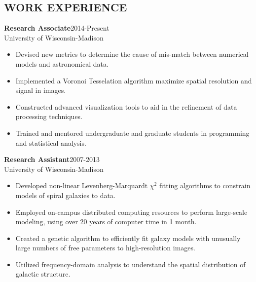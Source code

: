 \documentclass[11pt, margin]{res_hacked_long}
\begin{document}
\begin{resume}
\section{WORK EXPERIENCE}
{\bf Research Associate}\hfill\mbox{2014-Present}\\
University of Wisconsin-Madison
                  \vspace* {0.01 in}\begin{itemize} \itemsep -2pt
                    \item Devised new metrics to determine the cause
                      of mis-match between numerical models and
                      astronomical data.
                    \item Implemented a Voronoi Tesselation algorithm
                      maximize spatial resolution and signal in images.
                    \item Constructed advanced visualization tools to
                      aid in the refinement of data processing
                      techniques.
                    \item Trained and mentored undergraduate and
                      graduate students in programming and statistical analysis.
                    \end{itemize}
\vspace{-0.15in}
{\bf Research Assistant}\hfill\mbox{2007-2013}\\
University of Wisconsin-Madison
                  \vspace* {0.01 in}\begin{itemize} \itemsep -2pt
                    \item Developed non-linear Levenberg-Marquardt
                      $\chi^{2}$ fitting algorithms to constrain
                      models of spiral galaxies to data. 
                   \item Employed on-campus distributed computing
                     resources to perform large-scale modeling, using over 20 years of computer time
                     in 1 month.
                   \item Created a genetic
                     algorithm to efficiently fit galaxy models with
                     unusually large numbers of
                     free parameters to high-resolution images.
                   \item Utilized frequency-domain analysis to
                     understand the spatial distribution of galactic structure.

\end{itemize}
\end{resume}
\end{document}
